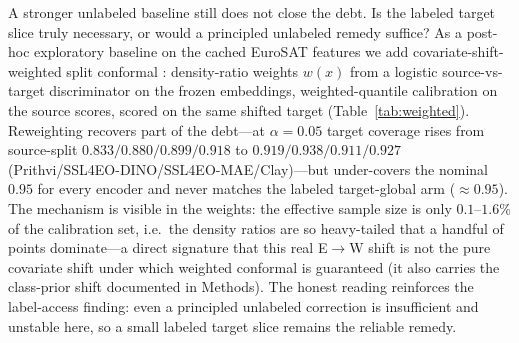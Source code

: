 \documentclass[journal]{IEEEtran}
\renewcommand{\_}{\textunderscore\allowbreak}
\begin{document}
A stronger unlabeled baseline still does not close the debt. Is the labeled target slice truly
necessary, or would a principled unlabeled remedy suffice? As a post-hoc exploratory baseline on the
cached EuroSAT features we add covariate-shift-weighted split conformal \citep{tibshirani2019covariate}:
density-ratio weights $w(x)$ from a logistic source-vs-target discriminator on the frozen embeddings,
weighted-quantile calibration on the source scores, scored on the same shifted target
(Table~\ref{tab:weighted}). Reweighting recovers part of the debt---at $\alpha=0.05$ target coverage
rises from source-split $0.833/0.880/0.899/0.918$ to $0.919/0.938/0.911/0.927$
(Prithvi/SSL4EO-DINO/SSL4EO-MAE/Clay)---but under-covers the nominal $0.95$ for every encoder and
never matches the labeled target-global arm (${\approx}0.95$). The mechanism is visible in the weights: the
effective sample size is only $0.1$--$1.6\%$ of the calibration set, i.e.\ the density ratios are so
heavy-tailed that a handful of points dominate---a direct signature that this real E$\to$W shift is
not the pure covariate shift under which weighted conformal is guaranteed (it also carries the
class-prior shift documented in Methods). The honest reading reinforces the label-access finding: even a
principled unlabeled correction is insufficient and unstable here, so a small labeled
target slice remains the reliable remedy.
\end{document}
